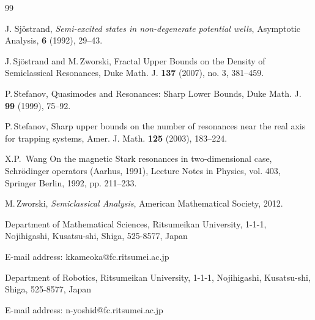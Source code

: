 \documentclass{article}
\theoremstyle{plain}
\theoremstyle{definition}
\theoremstyle{remark}
\begin{document}
\begin{thebibliography}{99}

 J. Sj\"ostrand, {\em Semi-excited states in non-degenerate potential wells}, 
Asymptotic Analysis, {\bf 6} (1992), 29--43.

J.\,Sj\"{o}strand and M.\,Zworski, 
Fractal Upper Bounds on the Density of Semiclassical Resonances, 
Duke Math. J. {\bf 137} (2007), no. 3, 381--459.

P.\,Stefanov, 
Quasimodes and Resonances: Sharp Lower Bounds, 
Duke Math. J. {\bf 99} (1999), 75--92.

P.\,Stefanov, 
Sharp upper bounds on the number of resonances near the real axis for trapping systems, 
Amer. J. Math. {\bf 125} (2003), 183--224.


X.P.\, Wang
On the magnetic Stark resonances in two-dimensional case,
Schr\"{o}dinger operators (Aarhus, 1991), Lecture Notes in Physics, vol. 403, Springer Berlin, 1992, pp. 211--233.

M.\,Zworski, 
{\em Semiclassical Analysis}, 
American Mathematical Society, 2012.

\end{thebibliography}

\noindent
Department of Mathematical Sciences, Ritsumeikan University, 
1-1-1, Nojihigashi, Kusatsu-shi, Shiga, 525-8577, Japan

\noindent
E-mail address: kkameoka@fc.ritsumei.ac.jp

\vspace{0.3cm}
\noindent
Department of Robotics, Ritsumeikan University, 
1-1-1, Nojihigashi, Kusatsu-shi, Shiga, 525-8577, Japan

\noindent
E-mail address: n-yoshid@fc.ritsumei.ac.jp
\end{document}
